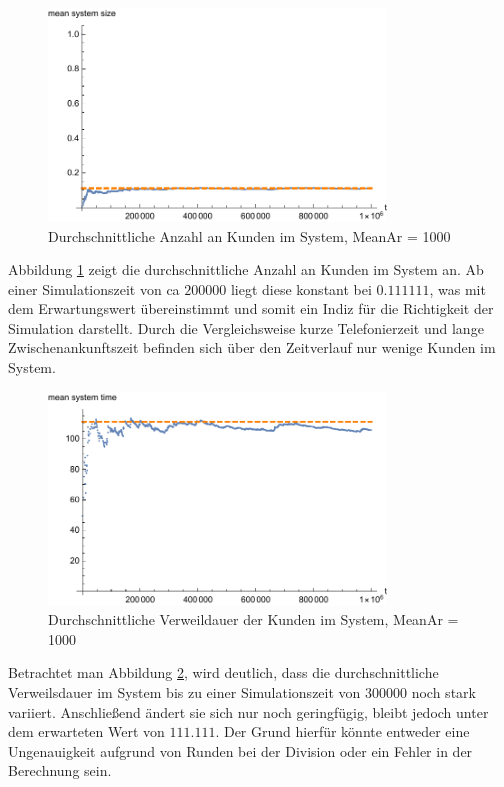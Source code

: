 \begin{figure}[htpb]
	\centering
	\includegraphics[width=0.8\textwidth]{abbildungen/1_Phone/Arrival_1000_Serve_100_dur_1000000_Skip_0/MeanSystemSize.pdf}
	\caption{Durchschnittliche Anzahl an Kunden im System, MeanAr = 1000}
	\label{fig:meanSystemSize1000}
\end{figure}

Abbildung \ref{fig:meanSystemSize1000} zeigt die durchschnittliche Anzahl an Kunden im System an. Ab einer Simulationszeit von ca $200000$ liegt diese konstant bei $0.111111$, was mit dem Erwartungswert übereinstimmt und somit ein Indiz für die Richtigkeit der Simulation darstellt. Durch die Vergleichsweise kurze Telefonierzeit und lange Zwischenankunftszeit befinden sich über den Zeitverlauf nur wenige Kunden im System. 

\begin{figure}[htpb]
	\centering
	\includegraphics[width=0.8\textwidth]{abbildungen/1_Phone/Arrival_1000_Serve_100_dur_1000000_Skip_0/MeanSystemTime.pdf}
	\caption{Durchschnittliche Verweildauer der Kunden im System, MeanAr = 1000}
	\label{fig:meanSystemTime1000}
\end{figure}

Betrachtet man Abbildung \ref{fig:meanSystemTime1000}, wird deutlich, dass die durchschnittliche Verweilsdauer im System bis zu einer Simulationszeit von $300000$ noch stark variiert. Anschließend ändert sie sich nur noch geringfügig, bleibt jedoch unter dem erwarteten Wert von $111.111$. Der Grund hierfür könnte entweder eine Ungenauigkeit aufgrund von Runden bei der Division oder ein Fehler in der Berechnung sein.

